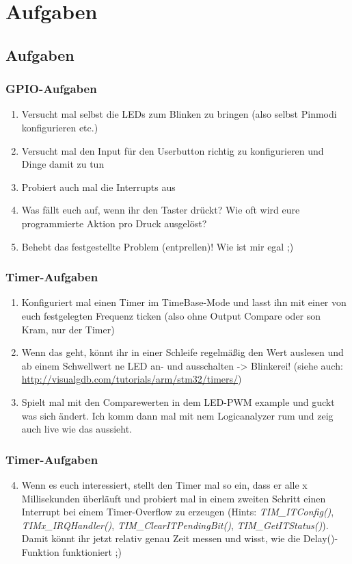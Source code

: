 \documentclass[ngerman,compress]{beamer}
\begin{document}
\section{Aufgaben}
\subsection{Aufgaben}
\begin{frame}
	\frametitle{GPIO-Aufgaben}
	\begin{enumerate}
		\item Versucht mal selbst die LEDs zum Blinken zu bringen (also selbst Pinmodi konfigurieren etc.)
		\item Versucht mal den Input für den Userbutton richtig zu konfigurieren und Dinge damit zu tun
		\item Probiert auch mal die Interrupts aus
		\item Was fällt euch auf, wenn ihr den Taster drückt? Wie oft wird eure programmierte Aktion pro Druck ausgelöst?
		\item Behebt das festgestellte Problem (entprellen)! Wie ist mir egal ;)
	\end{enumerate}
\end{frame}

\begin{frame}
	\frametitle{Timer-Aufgaben}
	\begin{enumerate}
		\item Konfiguriert mal einen Timer im TimeBase-Mode und lasst ihn mit einer von euch festgelegten Frequenz ticken (also ohne Output Compare oder son Kram, nur der Timer)
		\item Wenn das geht, könnt ihr in einer Schleife regelmäßig den Wert auslesen und ab einem Schwellwert ne LED an- und ausschalten -> Blinkerei! (siehe auch: \url{http://visualgdb.com/tutorials/arm/stm32/timers/})
		\item Spielt mal mit den Comparewerten in dem LED-PWM example und guckt was sich ändert. Ich komm dann mal mit nem Logicanalyzer rum und zeig auch live wie das aussieht.
	\end{enumerate}
\end{frame}

\begin{frame}
	\frametitle{Timer-Aufgaben}
	\begin{enumerate}
		\setcounter{enumi}{3}
		\item Wenn es euch interessiert, stellt den Timer mal so ein, dass er alle x Millisekunden überläuft und probiert mal in einem zweiten Schritt einen Interrupt bei einem Timer-Overflow zu erzeugen (Hints: \emph{TIM\_ITConfig()}, \emph{TIMx\_IRQHandler()}, \emph{TIM\_ClearITPendingBit()}, \emph{TIM\_GetITStatus()}). Damit könnt ihr jetzt relativ genau Zeit messen und wisst, wie die Delay()-Funktion funktioniert ;)
	\end{enumerate}
\end{frame}
\end{document}
